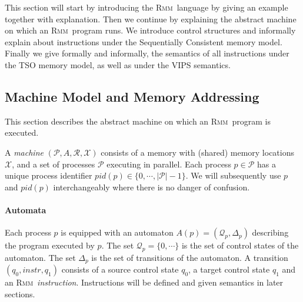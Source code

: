 \documentclass[a4paper]{article}
\newcommand{\rmm}{\textsc{Rmm}}
\begin{document}
This section will start by introducing the \rmm\ language by giving an
example together with explanation. Then we continue by explaining the
abstract machine on which an \rmm\ program runs. We introduce control
structures and informally explain about instructions under the
Sequentially Consistent memory model. Finally we give formally and
informally, the semantics of all instructions under the TSO memory
model, as well as under the VIPS semantics.

\subsection{Machine Model and Memory Addressing}\label{sec:abstmachinememaddr}

This section describes the abstract machine on which an \rmm\ program is
executed.

\newcommand{\vars}{\mathcal{X}} %
\newcommand{\procs}{\mathcal{P}} %
\newcommand{\automata}{A} %
\newcommand{\pautomaton}[1]{A(#1)} %
\newcommand{\regs}{\mathcal{R}} %
\newcommand{\pregs}[1]{\mathcal{R}(#1)} %
\newcommand{\pcstates}[1]{\mathcal{Q}_{#1}} %
\newcommand{\ptransitions}[1]{\Delta_{#1}} %


A \emph{machine} $(\procs,\automata,\regs,\vars)$ consists of a memory
with (shared) memory locations $\vars$, and a set of processes
$\procs$ executing in parallel. Each process $p\in\procs$ has a unique
process identifier $pid(p) \in \{0,\cdots,|\procs|-1\}$. We will
subsequently use $p$ and $pid(p)$ interchangeably where there is no
danger of confusion.

\paragraph{Automata}
Each process $p$ is equipped with an automaton $\pautomaton{p} =
(\pcstates{p},\ptransitions{p})$ describing the program executed by
$p$. The set $\pcstates{p} = \{0,\cdots\}$ is the set of control
states of the automaton. The set $\ptransitions{p}$ is the set of
transitions of the automaton. A transition $(q_0,instr,q_1)$ consists
of a source control state $q_0$, a target control state $q_1$ and an
\rmm\ \emph{instruction}. Instructions will be defined and given
semantics in later sections.
\end{document}
